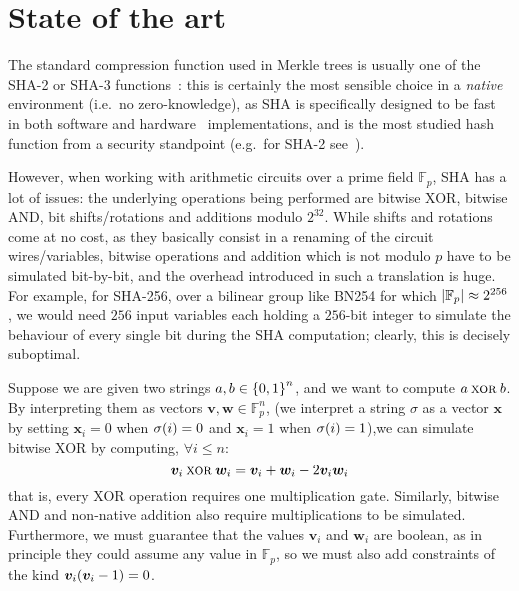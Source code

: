 \section{State of the art}\label{sec:sota}
The standard compression function used in Merkle trees is usually one of the SHA-2 or SHA-3 
functions~\cite{Dang2015}: this is certainly the most sensible choice in a \emph{native} 
environment (i.e.\ no zero-knowledge), as SHA is specifically designed to be fast in both software 
and hardware~\cite{DaddaMO2004,MichailAKTG2012} implementations, and is the most studied hash 
function from a security standpoint (e.g.\ for SHA-2 
see~\cite{KhovratovichRS2012,GuoLRW2010,DobraunigEM2016}).

However, when working with arithmetic circuits over a prime field \(\mathbb{F}_p\), SHA has a lot 
of issues: the underlying operations being performed are bitwise XOR, bitwise AND, 
bit shifts/rotations and additions modulo \(2^{32}\).
While shifts and rotations come at no cost, as they basically consist in a renaming of the circuit 
wires/variables, bitwise operations and addition which is not modulo \(p\) have to be simulated 
bit-by-bit, and the overhead introduced in such a translation is huge.
For example, for SHA-256, over a bilinear group like BN254 for which 
\(\left\lvert\mathbb{F}_p\right\rvert \approx 2^{256}\), we would need \(256\) input variables each holding a
\(256\)-bit integer to simulate the behaviour of every single bit during the SHA computation; 
clearly, this is decisely suboptimal.

\begin{example}
  Suppose we are given two strings \(a, b \in \left\{0, 1\right\}^{n}\), and we want to compute 
  \(a \mathbin{\textnormal{\textsc{xor}}} b\).
  By interpreting them as vectors \(\bm{v}, \bm{w} \in \mathbb{F}_{p}^{n}\), (we interpret 
  a string \(\sigma \) as a vector \(\bm{x}\) by setting \(\bm{x}_i = 0\) when 
  \(\call{\sigma}{i} = 0\) and \(\bm{x}_i = 1\) when \(\call{\sigma}{i} = 1\)),we can simulate 
  bitwise XOR by computing, \(\forall i \le n\):
  \[\bm{v}_{i} \mathbin{\textnormal{\textsc{xor}}} \bm{w}_{i} = \bm{v}_{i} + \bm{w}_{i} - 2\bm{v}_{i}\bm{w}_{i}\]
  that is, every XOR operation requires one multiplication gate.
  Similarly, bitwise AND and non-native addition also require multiplications to be simulated.
  Furthermore, we must guarantee that the values \(\bm{v}_i\) and \(\bm{w}_i\) are boolean, as 
  in principle they could assume any value in \(\mathbb{F}_p\), so we must also add constraints of 
  the kind \(\bm{v}_{i}\Parens*{\bm{v}_i - 1} = 0\).
\end{example}

